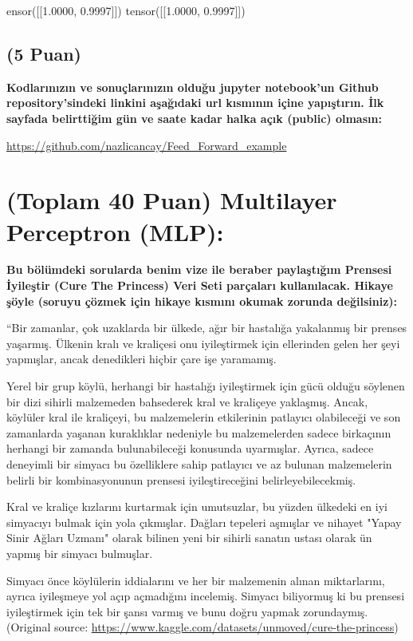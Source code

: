 \documentclass[11pt]{article}
\begin{document}
ensor([[1.0000, 0.9997]])
tensor([[1.0000, 0.9997]])

\subsection{(5 Puan)} \textbf{Kodlarınızın ve sonuçlarınızın olduğu jupyter notebook'un Github repository'sindeki linkini aşağıdaki url kısmının içine yapıştırın. İlk sayfada belirttiğim gün ve saate kadar halka açık (public) olmasın:}

\url{https://github.com/nazlicancay/Feed_Forward_example}


\section{(Toplam 40 Puan) Multilayer Perceptron (MLP):} 
\textbf{Bu bölümdeki sorularda benim vize ile beraber paylaştığım Prensesi İyileştir (Cure The Princess) Veri Seti parçaları kullanılacak. Hikaye şöyle (soruyu çözmek için hikaye kısmını okumak zorunda değilsiniz):} 

``Bir zamanlar, çok uzaklarda bir ülkede, ağır bir hastalığa yakalanmış bir prenses yaşarmış. Ülkenin kralı ve kraliçesi onu iyileştirmek için ellerinden gelen her şeyi yapmışlar, ancak denedikleri hiçbir çare işe yaramamış.

Yerel bir grup köylü, herhangi bir hastalığı iyileştirmek için gücü olduğu söylenen bir dizi sihirli malzemeden bahsederek kral ve kraliçeye yaklaşmış. Ancak, köylüler kral ile kraliçeyi, bu malzemelerin etkilerinin patlayıcı olabileceği ve son zamanlarda yaşanan kuraklıklar nedeniyle bu malzemelerden sadece birkaçının herhangi bir zamanda bulunabileceği konusunda uyarmışlar. Ayrıca, sadece deneyimli bir simyacı bu özelliklere sahip patlayıcı ve az bulunan malzemelerin belirli bir kombinasyonunun prensesi iyileştireceğini belirleyebilecekmiş.

Kral ve kraliçe kızlarını kurtarmak için umutsuzlar, bu yüzden ülkedeki en iyi simyacıyı bulmak için yola çıkmışlar. Dağları tepeleri aşmışlar ve nihayet "Yapay Sinir Ağları Uzmanı" olarak bilinen yeni bir sihirli sanatın ustası olarak ün yapmış bir simyacı bulmuşlar.

Simyacı önce köylülerin iddialarını ve her bir malzemenin alınan miktarlarını, ayrıca iyileşmeye yol açıp açmadığını incelemiş. Simyacı biliyormuş ki bu prensesi iyileştirmek için tek bir şansı varmış ve bunu doğru yapmak zorundaymış. (Original source: \url{https://www.kaggle.com/datasets/unmoved/cure-the-princess})
\end{document}
